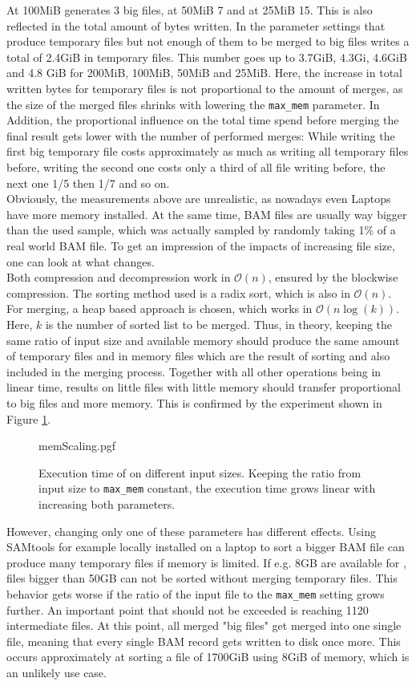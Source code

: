 At 100MiB \sort generates 3 big files, at 50MiB 7 and at 25MiB 15. This is also reflected in the total amount of bytes written. In the parameter settings that produce temporary files but not enough of them to be merged to big files \sort writes a total of 2.4GiB in temporary files. This number goes up to 3.7GiB, 4.3Gi, 4.6GiB and 4.8 GiB for 200MiB, 100MiB, 50MiB and 25MiB. Here, the increase in total written bytes for temporary files is not proportional to the amount of merges, as the size of the merged files shrinks with lowering the \texttt{max\_mem} parameter. In Addition, the proportional influence on the total time spend before merging the final result gets lower with the number of performed merges: While writing the first big temporary file costs approximately as much as writing all temporary files before, writing the second one costs only a third of all file writing before, the next one 1/5 then 1/7 and so on.\\
Obviously, the measurements above are unrealistic, as nowadays even Laptops have more memory installed. At the same time, BAM files are usually way bigger than the used sample, which was actually sampled by randomly taking 1\% of a real world BAM file. To get an impression of the impacts of increasing file size, one can look at what changes. \\
Both compression and decompression work in $\mathcal{O}(n)$, ensured by the blockwise compression. The sorting method used is a radix sort, which is also in $\mathcal{O}(n)$. For merging, a heap based approach is chosen, which works in $\mathcal{O}(n \log(k))$. Here, $k$ is the number of sorted list to be merged. Thus, in theory, keeping the same ratio of input size and available memory should produce the same amount of temporary files and in memory files which are the result of sorting and also included in the merging process. Together with all other operations being in linear time, results on little files with little memory should transfer proportional to big files and more memory. This is confirmed by the experiment shown in Figure \ref{fig:memScaling}.\\
\begin{figure}
        {memScaling.pgf}
    \caption{Execution time of \sort on different input sizes. Keeping the ratio from input size to \texttt{max\_mem} constant, the execution time grows linear with increasing both parameters.}
    \label{fig:memScaling}
\end{figure}
However, changing only one of these parameters has different effects. Using SAMtools for example locally installed on a laptop to sort a bigger BAM file can produce many temporary files if memory is limited. If e.g. 8GB are available for \sort, files bigger than 50GB can not be sorted without merging temporary files. This behavior gets worse if the ratio of the input file to the \texttt{max\_mem} setting grows further. An important point that should not be exceeded is reaching 1120 intermediate files. At this point, all merged "big files" get merged into one single file, meaning that every single BAM record gets written to disk once more. This occurs approximately at sorting a file of 1700GiB using 8GiB of memory, which is an unlikely use case. \\
